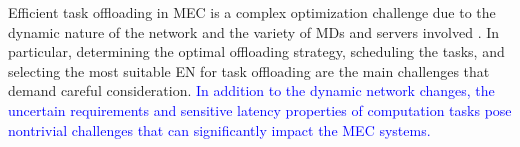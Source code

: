 \documentclass[12pt,draftclsnofoot,onecolumn]{IEEEtran}
\begin{document}
Efficient task offloading in MEC is a complex optimization challenge due to the dynamic nature of the network and the variety of MDs and servers involved \cite{jiang2019toward} \cite{TNSE-WU-24}. In particular, determining the optimal offloading strategy, scheduling the tasks, and selecting the most suitable EN for task offloading are the main challenges that demand careful consideration. \textcolor{blue}{In addition to the dynamic network changes, the uncertain requirements and sensitive latency properties of computation tasks pose nontrivial challenges that can significantly impact the MEC systems.}


\end{document}
